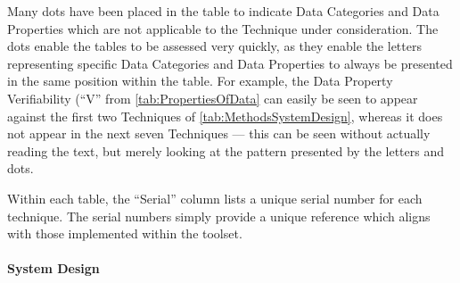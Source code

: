 Many dots have been placed in the table to indicate Data Categories and Data Properties which are not applicable to the Technique under consideration. The dots enable the tables to be assessed very quickly, as they enable the letters representing specific Data Categories and Data Properties to always be presented in the same position within the table. For example, the Data Property Verifiability (``V'' from \autoref{tab:PropertiesOfData} can easily be seen to appear against the first two Techniques of \autoref{tab:MethodsSystemDesign}, whereas it does not appear in the next seven Techniques --- this can be seen without actually reading the text, but merely looking at the pattern presented by the letters and dots. 

Within each table, the ``Serial'' column lists a unique serial number for each technique. The serial numbers simply provide a unique reference which aligns with those implemented within the toolset.

\paragraph{System Design}

